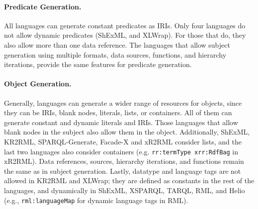 \noindent\paragraph{\textbf{Predicate Generation.}} All languages can generate constant predicates as IRIs. Only four languages do not allow dynamic predicates (ShExML, and XLWrap). For those that do, they also allow more than one data reference. The languages that allow subject generation using multiple formats, data sources, functions, and hierarchy iterations, provide the same features for predicate generation.

\noindent\paragraph{\textbf{Object Generation.}} %
Generally, languages can generate a wider range of resources for objects, since they can be IRIs, blank nodes, literals, lists, or containers. All of them can generate constant and dynamic literals and IRIs. Those languages that allow blank nodes in the subject also allow them in the object. Additionally, ShExML, KR2RML, SPARQL-Generate, Facade-X and xR2RML consider lists, and the last two languages also consider containers (e.g. \texttt{rr:termType xrr:RdfBag} in xR2RML). Data references, sources, hierarchy iterations, and functions remain the same as in subject generation. Lastly, datatype and language tags are not allowed in KR2RML and XLWrap; they are defined as constants in the rest of the languages, and dynamically in ShExML, XSPARQL, TARQL, RML, and Helio (e.g., \texttt{rml:languageMap} for dynamic language tags in RML).

%

